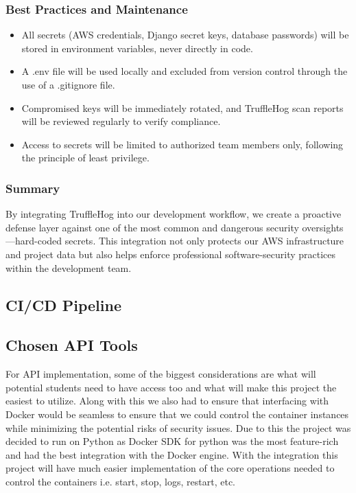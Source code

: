 \documentclass[12pt]{article}
\begin{document}
\subsubsection{Best Practices and Maintenance}
\begin{itemize}
    \item All secrets (AWS credentials, Django secret keys, database passwords) will be stored in environment variables, never directly in code.
    \item A .env file will be used locally and excluded from version control through the use of a .gitignore file.
    \item Compromised keys will be immediately rotated, and TruffleHog scan reports will be reviewed regularly to verify compliance.
    \item Access to secrets will be limited to authorized team members only, following the principle of least privilege.
\end{itemize}

\subsubsection{Summary}
By integrating TruffleHog into our development workflow, we create a proactive defense layer against one of the most common and dangerous security oversights—hard-coded secrets. This integration not only protects our AWS infrastructure and project data but also helps enforce professional software-security practices within the development team.

\subsection{CI/CD Pipeline}

\subsection{Chosen API Tools}
For API implementation, some of the biggest considerations are what will potential students need to have access too and what will make this project the easiest to utilize. Along with this we also had to ensure that interfacing with Docker would be seamless to ensure that we could control the container instances while minimizing the potential risks of security issues. Due to this the project was decided to run on Python as Docker SDK for python was the most feature-rich and had the best integration with the Docker engine. With the integration this project will have much easier implementation of the core operations needed to control the containers i.e. start, stop, logs, restart, etc.
\end{document}
